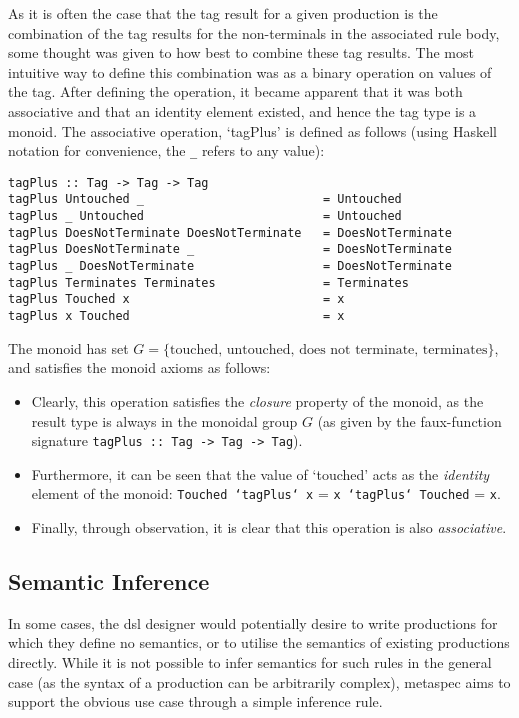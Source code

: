 As it is often the case that the tag result for a given production is the combination of the tag results for the non-terminals in the associated rule body, some thought was given to how best to combine these tag results.
The most intuitive way to define this combination was as a binary operation on values of the tag. 
After defining the operation, it became apparent that it was both associative and that an identity element existed, and hence the tag type is a \gls{monoid}.
The associative operation, `tagPlus' is defined as follows (using Haskell notation for convenience, the \texttt{_} refers to any value):
\begin{verbatim}
tagPlus :: Tag -> Tag -> Tag
tagPlus Untouched _                         = Untouched
tagPlus _ Untouched                         = Untouched
tagPlus DoesNotTerminate DoesNotTerminate   = DoesNotTerminate
tagPlus DoesNotTerminate _                  = DoesNotTerminate
tagPlus _ DoesNotTerminate                  = DoesNotTerminate
tagPlus Terminates Terminates               = Terminates
tagPlus Touched x                           = x
tagPlus x Touched                           = x
\end{verbatim}

The monoid has set $G = \{\text{touched, untouched, does not terminate, terminates}\}$, and satisfies the monoid axioms as follows:
\begin{itemize}
    \item Clearly, this operation satisfies the \textit{closure} property of the monoid, as the result type is always in the monoidal group $G$ (as given by the faux-function signature \texttt{tagPlus :: Tag -> Tag -> Tag}).
    \item Furthermore, it can be seen that the value of `touched' acts as the \textit{identity} element of the monoid: \texttt{Touched `tagPlus` x} = \texttt{x `tagPlus` Touched} = \texttt{x}.
    \item Finally, through observation, it is clear that this operation is also \textit{associative}.
\end{itemize}



\subsection{Semantic Inference} %
\label{sub:semantic_inference}
In some cases, the \gls{dsl} designer would potentially desire to write productions for which they define no semantics, or to utilise the semantics of existing productions directly.
While it is not possible to infer semantics for such rules in the general case (as the syntax of a production can be arbitrarily complex), \gls{metaspec} aims to support the obvious use case through a simple inference rule. \\

